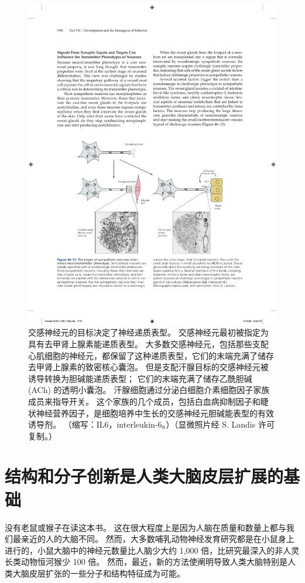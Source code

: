 \begin{figure}[htbp]
	\centering
	\includegraphics[width=0.8\linewidth]{chap46/fig_46_13}
	\caption{交感神经元的目标决定了神经递质表型。 交感神经元最初被指定为具有去甲肾上腺素能递质表型。 大多数交感神经元，包括那些支配心肌细胞的神经元，都保留了这种递质表型，它们的末端充满了储存去甲肾上腺素的致密核心囊泡。 但是支配汗腺目标的交感神经元被诱导转换为胆碱能递质表型； 它们的末端充满了储存乙酰胆碱 (ACh) 的透明小囊泡。 汗腺细胞通过分泌白细胞介素细胞因子家族成员来指导开关。 这个家族的几个成员，包括白血病抑制因子和睫状神经营养因子，是细胞培养中生长的交感神经元胆碱能表型的有效诱导剂。 （缩写：IL6，interleukin-6。）（显微照片经 S. Landis 许可复制。）}
	\label{fig:46_13}
\end{figure}


\section{结构和分子创新是人类大脑皮层扩展的基础}

没有老鼠或猴子在读这本书。 这在很大程度上是因为人脑在质量和数量上都与我们最亲近的人的大脑不同。 然而，大多数哺乳动物神经发育研究都是在小鼠身上进行的，小鼠大脑中的神经元数量比人脑少大约 1,000 倍，比研究最深入的非人灵长类动物恒河猴少 100 倍。 然而，最近，新的方法使阐明导致人类大脑特别是人类大脑皮层扩张的一些分子和结构特征成为可能。

